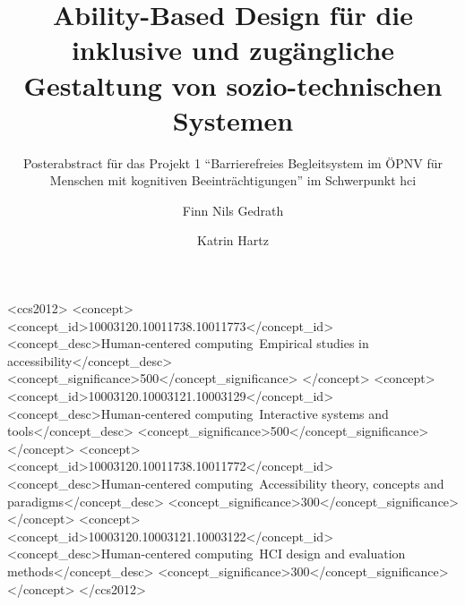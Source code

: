 \documentclass[sigchi-a,screen,nonacm,language=german]{acmart}
\theoremstyle{acmdefinition}
\begin{document}
\title{Ability-Based Design für die inklusive und zugängliche Gestaltung von sozio-technischen Systemen}
\subtitle{Posterabstract für das Projekt 1 \enquote{Barrierefreies Begleitsystem im ÖPNV für Menschen mit kognitiven Beeinträchtigungen} im Schwerpunkt \acf{hci}}

\author{Finn Nils Gedrath}

\author{Katrin Hartz}
\authornotemark[2]



\renewcommand{\shortauthors}{Finn Nils Gedrath und Katrin Hartz}


\begin{CCSXML}
<ccs2012>
   <concept>
       <concept_id>10003120.10011738.10011773</concept_id>
       <concept_desc>Human-centered computing~Empirical studies in accessibility</concept_desc>
       <concept_significance>500</concept_significance>
       </concept>
   <concept>
       <concept_id>10003120.10003121.10003129</concept_id>
       <concept_desc>Human-centered computing~Interactive systems and tools</concept_desc>
       <concept_significance>500</concept_significance>
       </concept>
   <concept>
       <concept_id>10003120.10011738.10011772</concept_id>
       <concept_desc>Human-centered computing~Accessibility theory, concepts and paradigms</concept_desc>
       <concept_significance>300</concept_significance>
       </concept>
   <concept>
       <concept_id>10003120.10003121.10003122</concept_id>
       <concept_desc>Human-centered computing~HCI design and evaluation methods</concept_desc>
       <concept_significance>300</concept_significance>
       </concept>
 </ccs2012>
\end{CCSXML}
\end{document}
